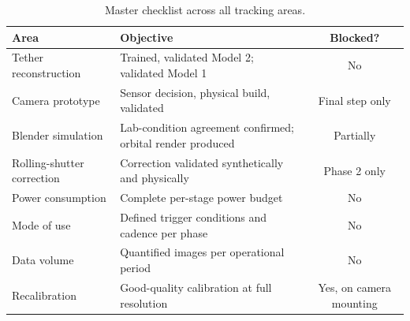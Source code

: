 \begin{table}[!ht]
\centering
\small
\begin{tabularx}{\textwidth}{p{} X c}
\toprule
\textbf{Area} & \textbf{Objective} & \textbf{Blocked?} \\
\midrule
Tether reconstruction & Trained, validated Model 2; validated Model 1 & No \\
Camera prototype & Sensor decision, physical build, validated & Final step only \\
Blender simulation & Lab-condition agreement confirmed; orbital render produced & Partially \\
Rolling-shutter correction & Correction validated synthetically and physically & Phase 2 only \\
Power consumption & Complete per-stage power budget & No \\
Mode of use & Defined trigger conditions and cadence per phase & No \\
Data volume & Quantified images per operational period & No \\
Recalibration & Good-quality calibration at full resolution & Yes, on camera mounting \\
\bottomrule
\end{tabularx}
\caption{Master checklist across all tracking areas.}
\label{tab:master-checklist}
\end{table}

